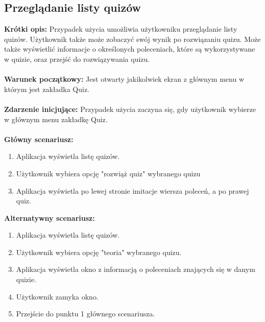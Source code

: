 \documentclass[10pt,a4paper]{report}
\begin{document}
\begin{adjustwidth}{2cm}{2cm}
\subsection{Przeglądanie listy quizów}
\begin{minipage}{1\linewidth}
\textbf{Krótki opis:} Przypadek użycia umożliwia użytkowniku przeglądanie listy quizów. Użytkownik także może zobaczyć swój wynik po rozwiązaniu quizu. Może także wyświetlić informacje o określonych poleceniach, które są wykorzystywane w quizie, oraz przejść do rozwiązywania quizu.  \\ \\
\textbf{Warunek początkowy:} Jest otwarty jakikolwiek ekran z głównym menu w którym jest zakładka Quiz. \\ \\
\textbf{Zdarzenie inicjujące:} Przypadek użycia zaczyna się, gdy użytkownik wybierze w głównym menu zakładkę Quiz. \\ \\
\textbf{Główny scenariusz:} 
\begin{enumerate}
\setlength\itemsep{0.2cm}
    \item Aplikacja wyświetla listę quizów.
    \item Użytkownik wybiera opcję "rozwiąż quiz" wybranego quizu
    \item Aplikacja wyświetla po lewej stronie imitacje wiersza poleceń, a po prawej quiz. \\
\end{enumerate}
\textbf{Alternatywny scenariusz:} 
\begin{enumerate}
\setlength\itemsep{0.2cm}
    \item Aplikacja wyświetla listę quizów.
    \item Użytkownik wybiera opcję "teoria" wybranego quizu.
    \item Aplikacja wyświetla okno z informacją o poleceniach znających się w danym quizie.
    \item Użytkownik zamyka okno.
    \item Przejście do punktu 1 głównego scenariusza.
\end{enumerate}
\end{minipage}

\end{adjustwidth}
\end{document}
